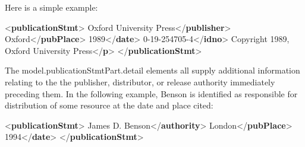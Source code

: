 Here is a simple example: \par\bgroup{}\exampleFont \begin{shaded}\noindent\mbox{}{<\textbf{publicationStmt}>}\mbox{}\newline 
{}Oxford University Press{</\textbf{publisher}>}\mbox{}\newline 
{}Oxford{</\textbf{pubPlace}>}\mbox{}\newline 
{}1989{</\textbf{date}>}\mbox{}\newline 
{}0-19-254705-4{</\textbf{idno}>}\mbox{}\newline 
{}\mbox{}\newline 
\hspace*{1em}Copyright 1989, Oxford University Press{</\textbf{p}>}\mbox{}\newline 
{}\mbox{}\newline 
{</\textbf{publicationStmt}>}\end{shaded}\egroup\par \par
The \textsf{model.publicationStmtPart.detail} elements all supply additional information relating to the the publisher, distributor, or release authority immediately preceding them. In the following example, Benson is identified as responsible for distribution of some resource at the date and place cited: \par\bgroup{}\exampleFont \begin{shaded}\noindent\mbox{}{<\textbf{publicationStmt}>}\mbox{}\newline 
{}James D. Benson{</\textbf{authority}>}\mbox{}\newline 
{}London{</\textbf{pubPlace}>}\mbox{}\newline 
{}1994{</\textbf{date}>}\mbox{}\newline 
{</\textbf{publicationStmt}>}\end{shaded}\egroup\par \par

